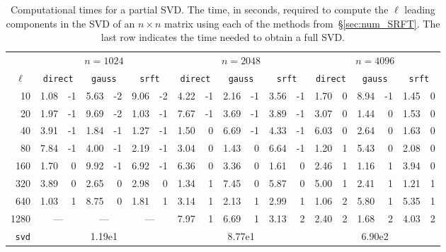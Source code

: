 \documentclass[final]{siamltex}
\begin{document}
\begin{table}
\begin{center}
\parbox{5in}{
\caption{{\rm Computational times for a partial SVD.} The time, in seconds, required to compute the $\ell$
leading components in the SVD of an $n\times n$ matrix using each of the methods from~\S\ref{sec:num_SRFT}.
The last row indicates the time needed to obtain a full SVD.}
\label{tab:runtimes}}

\renewcommand{\arraystretch}{1.1}

{\scriptsize
\begin{tabular}{|r||r@{e}r|r@{e}r|r@{e}r||r@{e}r|r@{e}r|r@{e}r||r@{e}r|r@{e}r|r@{e}r|} \hline
& \multicolumn{6}{|c||}{$n = 1024$} & \multicolumn{6}{|c||}{$n = 2048$} & \multicolumn{6}{|c|}{$n = 4096$}\\
\multicolumn{1}{|c||}{$\ell$} &
    \multicolumn{2}{c}{\tt direct} & \multicolumn{2}{c}{\tt gauss} & \multicolumn{2}{c||}{\tt srft} &
    \multicolumn{2}{c}{\tt direct} & \multicolumn{2}{c}{\tt gauss} & \multicolumn{2}{c||}{\tt srft} &
    \multicolumn{2}{c}{\tt direct} & \multicolumn{2}{c}{\tt gauss} & \multicolumn{2}{c|}{\tt srft} \\ \hline
10  &
%
1.08&-1  &  5.63&-2  &  9.06&-2  &  4.22&-1  &  2.16&-1  &  3.56&-1  &  1.70&\phantom{-}0  &  8.94&-1  &  1.45&\phantom{-}0  \\
20  &
%
1.97&-1  &  9.69&-2  &  1.03&-1  &  7.67&-1  &  3.69&-1  &  3.89&-1  &  3.07&0  &  1.44&0  &  1.53&0  \\
40  &
%
3.91&-1  &  1.84&-1  &  1.27&-1  &  1.50&0  &  6.69&-1  &  4.33&-1  &  6.03&0  &  2.64&0  &  1.63&0  \\
80  &
%
7.84&-1  &  4.00&-1  &  2.19&-1  &  3.04&0  &  1.43&0  &  6.64&-1  &  1.20&1  &  5.43&0  &  2.08&0  \\
160  &
%
1.70&0  &  9.92&-1  &  6.92&-1  &  6.36&0  &  3.36&0  &  1.61&0  &  2.46&1  &  1.16&1  &  3.94&0  \\
320  &
%
3.89&0  &  2.65&0  &  2.98&0  &  1.34&1  &  7.45&0  &  5.87&0  &  5.00&1  &  2.41&1  &  1.21&1  \\
640  &
%
1.03&1  &  8.75&0  &  1.81&1  &  3.14&1  &  2.13&1  &  2.99&1  &  1.06&2  &  5.80&1  &  5.35&1  \\
1280  &
%
\multicolumn{2}{c|}{---} & \multicolumn{2}{c|}{---} & \multicolumn{2}{c||}{---} &
7.97&1  &  6.69&1  &  3.13&2  &  2.40&2  &  1.68&2  &  4.03&2  \\ \hline \hline
{\tt svd} &
    \multicolumn{2}{|c}{} & \multicolumn{2}{c}{1.19e\phantom{-}1} & \multicolumn{2}{c||}{} &
    \multicolumn{2}{|c}{} & \multicolumn{2}{c}{8.77e\phantom{-}1} & \multicolumn{2}{c||}{} &
    \multicolumn{2}{|c}{} & \multicolumn{2}{c}{6.90e\phantom{-}2} & \multicolumn{2}{c|}{} \\ \hline
\end{tabular}
}
\end{center}
\end{table}
\end{document}
